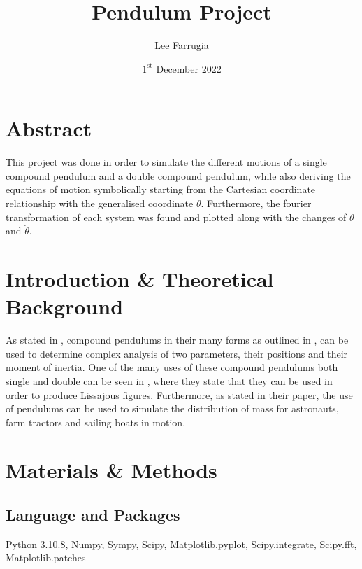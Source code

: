 \documentclass[12pt, a4paper]{article}
\title{Pendulum Project}
\date{\(1^\mathrm{{st}}\) December 2022}
\author{Lee Farrugia}
\begin{document}
    
\maketitle
\thispagestyle{titlepagestyle}
\pagestyle{mystyle}

\section{Abstract}
This project was done in order to simulate the different motions of a single compound pendulum and a double compound pendulum, while also deriving the equations of motion symbolically starting from the Cartesian coordinate relationship with the generalised coordinate \(\theta\). Furthermore, the fourier transformation of each system was found and plotted along with the changes of \(\theta\) and \(\dot{\theta}\).

\section{Introduction \& Theoretical Background}
As stated in \cite{hinrichsen1981practical}, compound pendulums in their many forms as outlined in \cite{harmographics1}, can be used to determine complex analysis of two parameters, their positions and their moment of inertia. One of the many uses of these compound pendulums both single and double can be seen in \cite{art}, where they state that they can be used in order to produce Lissajous figures. Furthermore, as \cite{hinrichsen1981practical} stated in their paper, the use of pendulums can be used to simulate the distribution of mass for astronauts, farm tractors and sailing boats in motion.

\section{Materials \& Methods}
\subsection{Language and Packages}
Python 3.10.8, Numpy, Sympy, Scipy, Matplotlib.pyplot, Scipy.integrate, Scipy.fft, Matplotlib.patches
\end{document}

